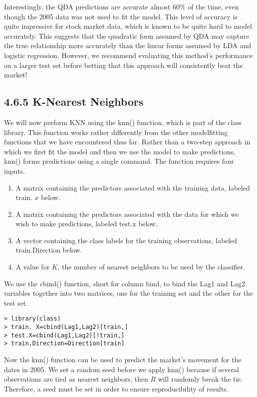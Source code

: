 \documentclass[10pt]{article}
\begin{document}
Interestingly, the QDA predictions are accurate almost $60 \%$ of the time, even though the 2005 data was not used to fit the model. This level of accuracy is quite impressive for stock market data, which is known to be quite hard to model accurately. This suggests that the quadratic form assumed by QDA may capture the true relationship more accurately than the linear forms assumed by LDA and logistic regression. However, we recommend evaluating this method's performance on a larger test set before betting that this approach will consistently beat the market!

\subsection*{4.6.5 K-Nearest Neighbors}
We will now perform KNN using the knn() function, which is part of the class library. This function works rather differently from the other modelfitting functions that we have encountered thus far. Rather than a two-step approach in which we first fit the model and then we use the model to make predictions, knn() forms predictions using a single command. The function requires four inputs.

\begin{enumerate}
  \item A matrix containing the predictors associated with the training data, labeled train. $x$ below.
  \item A matrix containing the predictors associated with the data for which we wish to make predictions, labeled test.x below.
 
 \item A vector containing the class labels for the training observations, labeled train.Direction below.
  \item A value for $K$, the number of nearest neighbors to be used by the classifier.
\end{enumerate}

We use the cbind() function, short for column bind, to bind the Lag1 and Lag2 variables together into two matrices, one for the training set and the other for the test set.

\begin{verbatim}
> library(class)
> train. X=cbind(Lag1,Lag2)[train,]
> test.X=cbind(Lag1,Lag2)[!train,]
> train.Direction=Direction[train]
\end{verbatim}

Now the knn() function can be used to predict the market's movement for the dates in 2005. We set a random seed before we apply knn() because if several observations are tied as nearest neighbors, then $R$ will randomly break the tie. Therefore, a seed must be set in order to ensure reproducibility of results.
\end{document}
